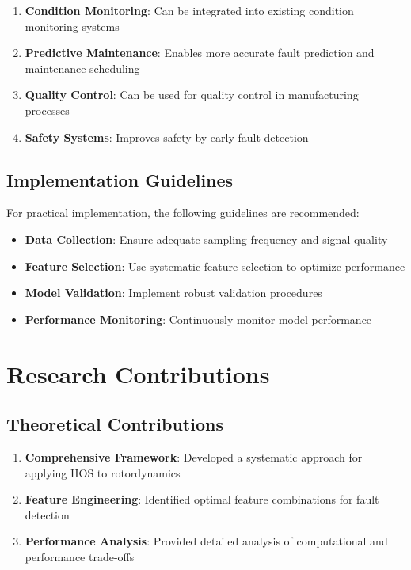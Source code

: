 \begin{enumerate}
    \item \textbf{Condition Monitoring}: Can be integrated into existing condition monitoring systems
    \item \textbf{Predictive Maintenance}: Enables more accurate fault prediction and maintenance scheduling
    \item \textbf{Quality Control}: Can be used for quality control in manufacturing processes
    \item \textbf{Safety Systems}: Improves safety by early fault detection
\end{enumerate}

\subsection{Implementation Guidelines}

For practical implementation, the following guidelines are recommended:

\begin{itemize}
    \item \textbf{Data Collection}: Ensure adequate sampling frequency and signal quality
    \item \textbf{Feature Selection}: Use systematic feature selection to optimize performance
    \item \textbf{Model Validation}: Implement robust validation procedures
    \item \textbf{Performance Monitoring}: Continuously monitor model performance
\end{itemize}

\section{Research Contributions}

\subsection{Theoretical Contributions}

\begin{enumerate}
    \item \textbf{Comprehensive Framework}: Developed a systematic approach for applying HOS to rotordynamics
    \item \textbf{Feature Engineering}: Identified optimal feature combinations for fault detection
    \item \textbf{Performance Analysis}: Provided detailed analysis of computational and performance trade-offs
\end{enumerate}

